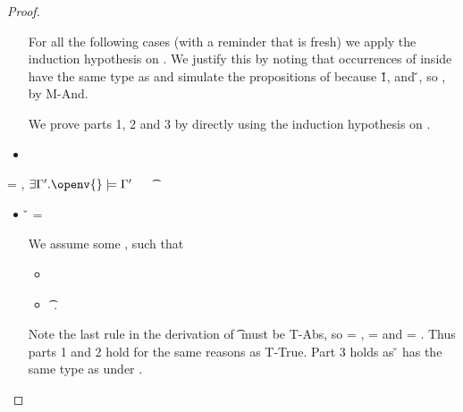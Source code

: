 \begin{lemma}
\begin{proof}
\begin{case}[T-Let]
\begin{itemize}
\begin{subcase}[B-Let]
        For all the following cases (with a reminder that \x{} is fresh)
        we apply the induction hypothesis on . We justify this by noting
        that occurrences of \x{} inside  have the same type as  and 
        simulate the propositions of 
        because 
        \opsem {\openv{}} {} {\v{1}},
        and
         {} {\v{}},
        so \satisfies{\openv{}}{\propenv{}, {\isprop {\s{}} {\x{}}}, \propp{}, \proppp{}},
        by M-And.

        We prove parts 1, 2 and 3 by directly using the induction hypothesis on .
      \end{subcase}
    \item[]
      \begin{subcase}[BE-Let]
      \end{subcase}
  \end{itemize}
\end{case}

\begin{case}[T-Clos] \e{} = {\closure {\openv{}} {\abs {\x{}} {\s{}} {}}},
  {\thenprop {\prop{}}}
  $\exists {\propenvp{}}. \satisfies{\openv{}}{\propenvp{}}$
  \ \ 
\judgement {\propenvp{}} { {\t{}}}
                 {\filterset {\thenprop {\prop{}}}
                             {\elseprop {\prop{}}}}
                 {\object{}}

  \begin{itemize}
    \item[]
      \begin{subcase}[B-Abs] \v{} = {\closure {\openv{}} {\abs {\x{}} {\s{}} {}}}

        We assume some \propenvp{}, such that
        \begin{itemize}
          \item \satisfies{\openv{}}{\propenvp{}}
          \item \judgement {\propenvp{}} { {\t{}}}
                           {\filterset {\thenprop {\prop{}}}
                                       {\elseprop {\prop{}}}}
                           {\object{}}.
       \end{itemize}
       Note the last rule in the derivation of
          \judgement {\propenvp{}} { {\t{}}}
                           {\filterset {\thenprop {\prop{}}}
                                       {\elseprop {\prop{}}}}
                           {\object{}}
                           must be T-Abs, so 
                           {\thenprop {\prop{}}} = {\topprop{}},
                           {\elseprop {\prop{}}} = {\botprop{}}
                           and {\object{}} = {\emptyobject{}}.
         Thus parts 1 and 2 hold for the same reasons as T-True.
         Part 3 holds as \v{} has the same type as {\abs {\x{}} {\s{}} {}}
         under \propenvp{}.


\end{subcase}
\end{itemize}
\end{case}
\end{proof}
\end{lemma}
